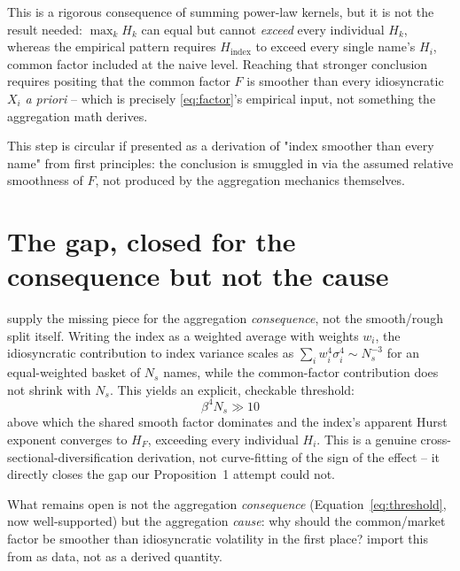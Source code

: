 \documentclass[11pt]{article}
\begin{document}
This is a rigorous consequence of summing power-law kernels, but it is not the result needed: $\max_k H_k$ can equal but cannot \emph{exceed} every individual $H_k$, whereas the empirical pattern requires $H_{\text{index}}$ to exceed every single name's $H_i$, common factor included at the naive level. Reaching that stronger conclusion requires positing that the common factor $F$ is smoother than every idiosyncratic $X_i$ \emph{a priori} -- which is precisely \eqref{eq:factor}'s empirical input, not something the aggregation math derives.

\begin{caveat}
This step is circular if presented as a derivation of "index smoother than every name" from first principles: the conclusion is smuggled in via the assumed relative smoothness of $F$, not produced by the aggregation mechanics themselves.
\end{caveat}

\section{The gap, closed for the consequence but not the cause}

\citet{zarhali2025nested} supply the missing piece for the aggregation \emph{consequence}, not the smooth/rough split itself. Writing the index as a weighted average with weights $w_i$, the idiosyncratic contribution to index variance scales as $\sum_i w_i^4\sigma_i^4 \sim N_s^{-3}$ for an equal-weighted basket of $N_s$ names, while the common-factor contribution does not shrink with $N_s$. This yields an explicit, checkable threshold:
\begin{equation}
\beta^4 N_s \gg 10 \label{eq:threshold}
\end{equation}
above which the shared smooth factor dominates and the index's apparent Hurst exponent converges to $H_F$, exceeding every individual $H_i$. This is a genuine cross-sectional-diversification derivation, not curve-fitting of the sign of the effect -- it directly closes the gap our Proposition~1 attempt could not.

\begin{finding}
What remains open is not the aggregation \emph{consequence} (Equation~\eqref{eq:threshold}, now well-supported) but the aggregation \emph{cause}: why should the common/market factor be smoother than idiosyncratic volatility in the first place? \citet{zarhali2025nested} import this from \citet{wu2022rough} as data, not as a derived quantity.
\end{finding}
\end{document}
